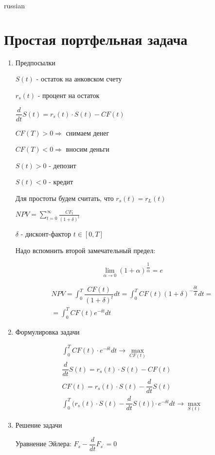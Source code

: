 \documentclass{article}
\begin{document}
\begin{otherlanguage*}{russian}
\section{\foreignlanguage{russian}{Простая портфельная задача}}
\begin{enumerate}
\item Предпосылки

$ S(t) $ - остаток на анковском счету 

$ r_s (t) $ - процент на остаток 

$ \dfrac{d}{dt} S(t) = r_s (t) \cdot S(t) - CF(t) $ 

$ CF(T) > 0 \Rightarrow $ снимаем денег 

$ CF(T) < 0 \Rightarrow $ вносим деньги  

$ S(t) > 0 $ - депозит 

$ S(t) < 0 $ - кредит 

Для простоты будем считать, что $ r_s(t) = r_L(t) $ 

$ NPV = \sum_{t=0}^\infty \frac{CF_t}{(1 + \delta)^t}$ 

$ \delta $ - дисконт-фактор $ t \in [0, T] $

Надо вспомнить второй замечательный предел:

\begin{equation*}
\lim_{\alpha \rightarrow 0 } (1 + \alpha) ^ {\dfrac{1}{\alpha}} = e 
\end{equation*}

\begin{align*}
NPV = \int_0^T \dfrac{CF(t)}{(1 + \delta)^t} dt = \int_0^T CF(t) (1 + \delta) ^{- \dfrac{\delta t}{\delta} } dt = \\ = \int_0^T CF(t) e^{-\delta t} dt 
\end{align*}

\item Формулировка задачи

\begin{align*}
\int_0^T CF(t) \cdot e ^{-\delta t} dt \rightarrow \max_{CF(t)} \\
\dfrac{d}{dt} S(t) = r_s (t) \cdot S(t) - CF(t) \\
CF(t) = r_s(t) \cdot S(t) - \dfrac{d}{dt} S(t) \\
\int_0^T \Big( r_s (t) \cdot S(t) - \dfrac{d}{dt} S(t) \Big) \cdot e^{-\delta t} dt \rightarrow \max_{S(t)} 
\end{align*}
\item Решение задачи

Уравнение Эйлера: $ F_s - \dfrac{d}{dt} F_{s^{'}} = 0$


\end{enumerate}
\end{otherlanguage*}
\end{document}
